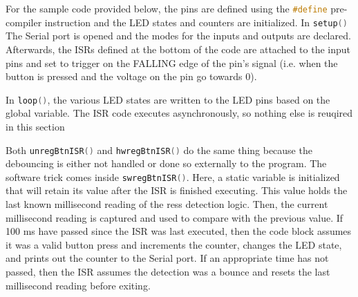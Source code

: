 \documentclass{article}
\begin{document}
    For the sample code provided below, the pins are defined using the \lstinline[language=C++, style=mystyle]{#define} pre-compiler instruction and the LED states and counters are initialized.
    In \lstinline[language=C++, style=mystyle]{setup()} The Serial port is opened and the modes for the inputs and outputs are declared.
    Afterwards, the ISRs defined at the bottom of the code are attached to the input pins and set to trigger on the FALLING edge of the pin's signal (i.e. when the button is pressed and the voltage on the pin go towards 0).

    In \lstinline[language=C++, style=mystyle]{loop()}, the various LED states are written to the LED pins based on the global variable.
    The ISR code executes asynchronously, so nothing else is reuqired in this section

    Both \lstinline[language=C++, style=mystyle]{unregBtnISR()} and \lstinline[language=C++, style=mystyle]{hwregBtnISR()} do the same thing because the debouncing is either not handled or done so externally to the program.
    The software trick comes inside \lstinline[language=C++, style=mystyle]{swregBtnISR()}.
    Here, a static variable is initialized that will retain its value after the ISR is finished executing.
    This value holds the last known millisecond reading of the ress detection logic.
    Then, the current millisecond reading is captured and used to compare with the previous value.
    If 100 ms have passed since the ISR was last executed, then the code block assumes it was a valid button press and increments the counter, changes the LED state, and prints out the counter to the Serial port.
    If an appropriate time has not passed, then the ISR assumes the detection was a bounce and resets the last millisecond reading before exiting.

    \pagebreak
    
\end{document}

